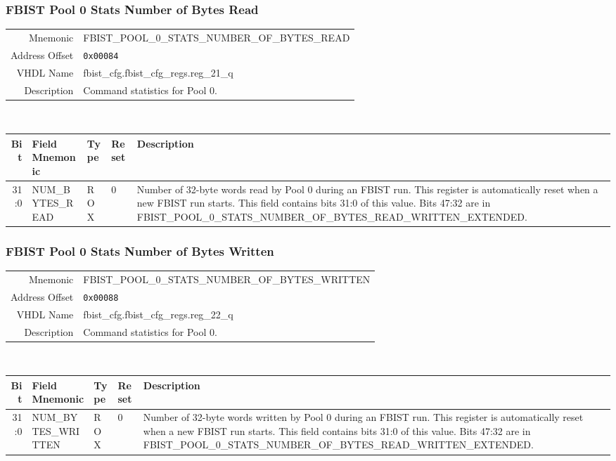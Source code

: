 \subsubsection{FBIST Pool 0 Stats Number of Bytes Read}
\begin{tabular}{ r | p{350px} }
  Mnemonic       & FBIST\_POOL\_0\_STATS\_NUMBER\_OF\_BYTES\_READ \\
  Address Offset & \texttt{0x00084}                               \\
  VHDL Name      &  fbist\_cfg.fbist\_cfg\_regs.reg\_21\_q        \\ \hline

  Description &
  Command statistics for Pool 0. \\
\end{tabular}
\\
\begin{tabularx}{\textwidth}{r|l|l|l|X}
  \hline
  Bit   & Field Mnemonic   & Type & Reset & Description \\ \hline

  31:0  & NUM\_BYTES\_READ & ROX  & 0     &

  Number of 32-byte words read by Pool 0 during an FBIST run. This
  register is automatically reset when a new FBIST run starts. This
  field contains bits 31:0 of this value. Bits 47:32 are in
  FBIST\_POOL\_0\_STATS\_NUMBER\_OF\_BYTES\_READ\_WRITTEN\_EXTENDED. \\
\end{tabularx}

\subsubsection{FBIST Pool 0 Stats Number of Bytes Written}
\begin{tabular}{ r | p{350px} }
  Mnemonic       & FBIST\_POOL\_0\_STATS\_NUMBER\_OF\_BYTES\_WRITTEN \\
  Address Offset & \texttt{0x00088}                                  \\
  VHDL Name      &  fbist\_cfg.fbist\_cfg\_regs.reg\_22\_q           \\ \hline

  Description &
  Command statistics for Pool 0. \\
\end{tabular}
\\
\begin{tabularx}{\textwidth}{r|l|l|l|X}
  \hline
  Bit   & Field Mnemonic      & Type & Reset & Description \\ \hline

  31:0  & NUM\_BYTES\_WRITTEN & ROX  & 0     &

  Number of 32-byte words written by Pool 0 during an FBIST run. This
  register is automatically reset when a new FBIST run starts. This
  field contains bits 31:0 of this value. Bits 47:32 are in
  FBIST\_POOL\_0\_STATS\_NUMBER\_OF\_BYTES\_READ\_WRITTEN\_EXTENDED. \\
\end{tabularx}

